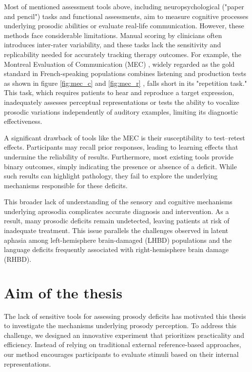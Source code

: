 Most of mentioned assessment tools above, including neuropsychological ("paper and pencil") tasks and functional assessments, aim to measure cognitive processes underlying prosodic abilities or evaluate real-life communication. However, these methods face considerable limitations. Manual scoring by clinicians often introduces inter-rater variability, and these tasks lack the sensitivity and replicability needed for accurately tracking therapy outcomes. For example, the Montreal Evaluation of Communication (MEC) \cite{joanette_y_ska_b_et_ct_h_protocole_2004}, widely regarded as the gold standard in French-speaking populations combines listening and production tests as shown in figure \ref{fig:mec_c} and \ref{fig:mec_r} , falls short in its "repetition task." This task, which requires patients to hear and reproduce a target expression, inadequately assesses perceptual representations or tests the ability to vocalize prosodic variations independently of auditory examples, limiting its diagnostic effectiveness.\cite{rosenbek_novel_2004}

A significant drawback of tools like the MEC is their susceptibility to test–retest effects. Participants may recall prior responses, leading to learning effects that undermine the reliability of results. Furthermore, most existing tools provide binary outcomes, simply indicating the presence or absence of a deficit. While such results can highlight pathology, they fail to explore the underlying mechanisms responsible for these deficits. \cite{benedetti_assessment_2022}

This broader lack of understanding of the sensory and cognitive mechanisms underlying aprosodia complicates accurate diagnosis and intervention. As a result, many prosodic deficits remain undetected, leaving patients at risk of inadequate treatment. This issue parallels the challenges observed in latent aphasia among left-hemisphere brain-damaged (LHBD) populations and the language deficits frequently associated with right-hemisphere brain damage (RHBD)\cite{martzoukou_undetected_2023}.


\section{Aim of the thesis}
The lack of sensitive tools for assessing prosody deficits has motivated this thesis to investigate the mechanisms underlying prosody perception. To address this challenge, we designed an innovative experiment that prioritizes practicality and efficiency. Instead of relying on traditional external reference-based approaches, our method encourages participants to evaluate stimuli based on their internal representations.

